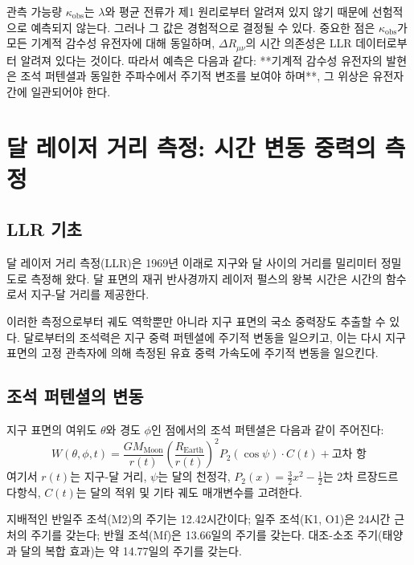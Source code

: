 \documentclass[12pt,a4paper]{article}
\theoremstyle{remark}
\begin{document}
	관측 가능량 \(\kappa_{\text{obs}}\)는 \(\lambda\)와 평균 전류가 제1 원리로부터 알려져 있지 않기 때문에 선험적으로 예측되지 않는다. 그러나 그 값은 경험적으로 결정될 수 있다. 중요한 점은 \(\kappa_{\text{obs}}\)가 모든 기계적 감수성 유전자에 대해 동일하며, \(\Delta R_{\mu\nu}\)의 시간 의존성은 LLR 데이터로부터 알려져 있다는 것이다. 따라서 예측은 다음과 같다: **기계적 감수성 유전자의 발현은 조석 퍼텐셜과 동일한 주파수에서 주기적 변조를 보여야 하며**, 그 위상은 유전자 간에 일관되어야 한다.
	
	\section{달 레이저 거리 측정: 시간 변동 중력의 측정}
	\label{sec:llr}
	
	\subsection{LLR 기초}
	
	달 레이저 거리 측정(LLR)은 1969년 이래로 \cite{LLR-IfE} 지구와 달 사이의 거리를 밀리미터 정밀도로 측정해 왔다. 달 표면의 재귀 반사경까지 레이저 펄스의 왕복 시간은 시간의 함수로서 지구-달 거리를 제공한다.
	
	이러한 측정으로부터 궤도 역학뿐만 아니라 지구 표면의 국소 중력장도 추출할 수 있다. 달로부터의 조석력은 지구 중력 퍼텐셜에 주기적 변동을 일으키고, 이는 다시 지구 표면의 고정 관측자에 의해 측정된 유효 중력 가속도에 주기적 변동을 일으킨다.
	
	\subsection{조석 퍼텐셜의 변동}
	
	지구 표면의 여위도 \(\theta\)와 경도 \(\phi\)인 점에서의 조석 퍼텐셜은 다음과 같이 주어진다:
	\begin{equation}
		W(\theta,\phi,t) = \frac{GM_{\text{Moon}}}{r(t)} \left(\frac{R_{\text{Earth}}}{r(t)}\right)^2 P_2(\cos\psi) \cdot C(t) + \text{고차 항}
		\label{eq:tidal-full}
	\end{equation}
	여기서 \(r(t)\)는 지구-달 거리, \(\psi\)는 달의 천정각, \(P_2(x)=\frac{3}{2}x^2-\frac12\)는 2차 르장드르 다항식, \(C(t)\)는 달의 적위 및 기타 궤도 매개변수를 고려한다.
	
	지배적인 반일주 조석(M2)의 주기는 12.42시간이다; 일주 조석(K1, O1)은 24시간 근처의 주기를 갖는다; 반월 조석(Mf)은 13.66일의 주기를 갖는다. 대조-소조 주기(태양과 달의 복합 효과)는 약 14.77일의 주기를 갖는다.
	
\end{document}
